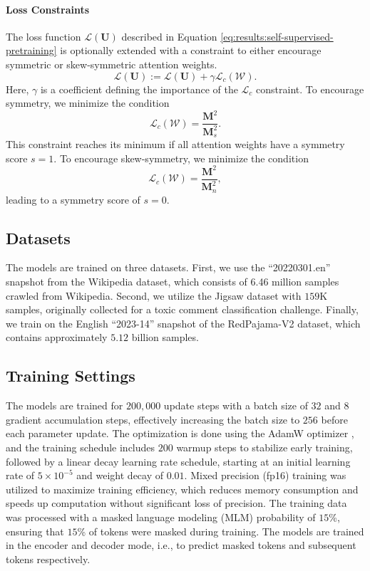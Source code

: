 \paragraph{Loss Constraints}
The loss function $\mathcal{L}(\bm{U})$ described in Equation \eqref{eq:results:self-supervised-pretraining} is optionally extended with a constraint to either encourage symmetric or skew-symmetric attention weights.
%
\begin{equation}
    \mathcal{L}(\bm{U}) := \mathcal{L}(\bm{U}) + \gamma \mathcal{L}_{c}(\mathcal{W}).
\end{equation}
%
Here, $\gamma$ is a coefficient defining the importance of the $\mathcal{L}_{c}$ constraint.
To encourage symmetry, we minimize the condition
%
\begin{equation}
    \mathcal{L}_c(\mathcal{W}) = \frac{\bm{M}^2}{\bm{M}_s^2}.
\end{equation}
%
This constraint reaches its minimum if all attention weights have a symmetry score $s=1$.
To encourage skew-symmetry, we minimize the condition
%
\begin{equation}
    \mathcal{L}_c(\mathcal{W}) = \frac{\bm{M}^2}{\bm{M}_n^2},
\end{equation}
%
leading to a symmetry score of $s=0$.


\subsection{Datasets}\label{sec:exp_bertmodels_datasets}
The models are trained on three datasets.
First, we use the ``20220301.en'' snapshot from the Wikipedia dataset, which consists of 6.46 million samples crawled from Wikipedia. Second, we utilize the Jigsaw dataset with $159$K samples, originally collected for a toxic comment classification challenge.
Finally, we train on the English ``2023-14'' snapshot of the RedPajama-V2 dataset, which contains approximately $5.12$ billion samples.

\subsection{Training Settings}\label{sec:exp_bertmodels_training}
The models are trained for $200,000$ update steps with a batch size of $32$ and $8$ gradient accumulation steps, effectively increasing the batch size to $256$ before each parameter update. The optimization is done using the AdamW optimizer \citep{Loshchilov_Hutter_2019}, and the training schedule includes $200$ warmup steps to stabilize early training, followed by a linear decay learning rate schedule, starting at an initial learning rate of $5 \times 10^{-5}$ and weight decay of $0.01$.
Mixed precision (fp16) training was utilized to maximize training efficiency, which reduces memory consumption and speeds up computation without significant loss of precision. The training data was processed with a masked language modeling (MLM) probability of $15$\%, ensuring that $15$\% of tokens were masked during training.
The models are trained in the encoder and decoder mode, i.e., to predict masked tokens and subsequent tokens respectively.

